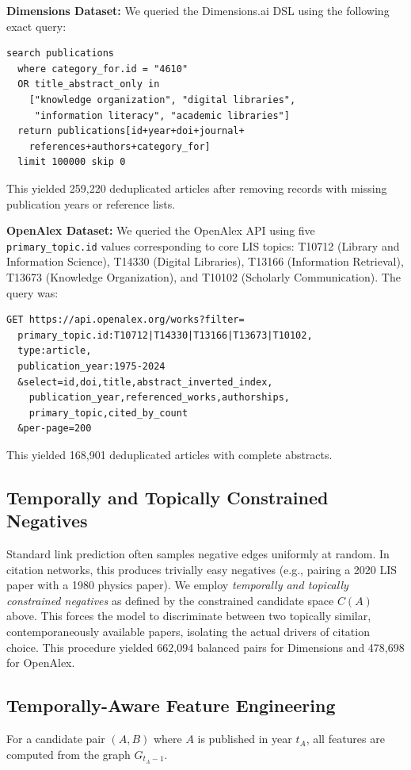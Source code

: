 \documentclass[11pt,a4paper]{article}
\begin{document}
\textbf{Dimensions Dataset:} We queried the Dimensions.ai DSL using the following exact query:
\begin{verbatim}
search publications
  where category_for.id = "4610"
  OR title_abstract_only in
    ["knowledge organization", "digital libraries",
     "information literacy", "academic libraries"]
  return publications[id+year+doi+journal+
    references+authors+category_for]
  limit 100000 skip 0
\end{verbatim}
This yielded 259,220 deduplicated articles after removing records with missing publication years or reference lists.

\textbf{OpenAlex Dataset:} We queried the OpenAlex API using five \texttt{primary\_topic.id} values corresponding to core LIS topics: T10712 (Library and Information Science), T14330 (Digital Libraries), T13166 (Information Retrieval), T13673 (Knowledge Organization), and T10102 (Scholarly Communication). The query was:
\begin{verbatim}
GET https://api.openalex.org/works?filter=
  primary_topic.id:T10712|T14330|T13166|T13673|T10102,
  type:article,
  publication_year:1975-2024
  &select=id,doi,title,abstract_inverted_index,
    publication_year,referenced_works,authorships,
    primary_topic,cited_by_count
  &per-page=200
\end{verbatim}
This yielded 168,901 deduplicated articles with complete abstracts.

\subsection{Temporally and Topically Constrained Negatives}
Standard link prediction often samples negative edges uniformly at random. In citation networks, this produces trivially easy negatives (e.g., pairing a 2020 LIS paper with a 1980 physics paper). We employ \textit{temporally and topically constrained negatives} as defined by the constrained candidate space $C(A)$ above. This forces the model to discriminate between two topically similar, contemporaneously available papers, isolating the actual drivers of citation choice. This procedure yielded 662,094 balanced pairs for Dimensions and 478,698 for OpenAlex.

\subsection{Temporally-Aware Feature Engineering}
For a candidate pair $(A, B)$ where $A$ is published in year $t_A$, all features are computed from the graph $G_{t_A-1}$.
\end{document}
